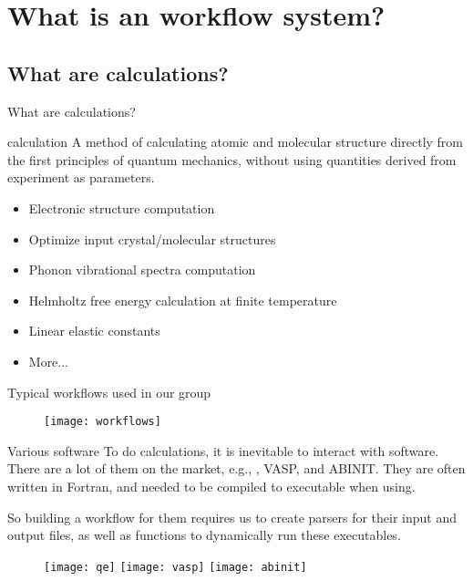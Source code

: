 \section{What is an \ab{} workflow system?}

\subsection{What are \ab{} calculations?}

\begin{frame}{What are \ab{} calculations?}
    \begin{definitionblock}{\ab{} calculation}
        A method of calculating atomic and molecular structure directly from the first
        principles of quantum mechanics, without using quantities derived from experiment
        as parameters.
    \end{definitionblock}

    \begin{itemize}
        \item Electronic structure computation
        \item Optimize input crystal/molecular structures
        \item Phonon vibrational spectra computation
        \item Helmholtz free energy calculation at finite temperature
        \item Linear elastic constants
        \item More...
    \end{itemize}
\end{frame}

\begin{frame}{Typical \ab{} workflows used in our group}
    \begin{figure}[H]
        \centering
        \texttt{[image: workflows]}
        \label{eq:workflows}
    \end{figure}
\end{frame}

\begin{frame}{Various \ab{} software}
    To do \ab{} calculations, it is inevitable to interact with \ab{} software.
    There are a lot of them on the market, e.g., \qe{}, VASP, and ABINIT.
    They are often written in Fortran, and needed to be compiled to executable
    when using.

    So building a workflow for them requires us to create parsers for their input and output
    files, as well as functions to dynamically run these executables.

    \begin{figure}[b]
        \centering
        \texttt{[image: qe]}
        \hfill
        \texttt{[image: vasp]}
        \hfill
        \texttt{[image: abinit]}
        \label{fig:abinitsoftware}
    \end{figure}
\end{frame}
